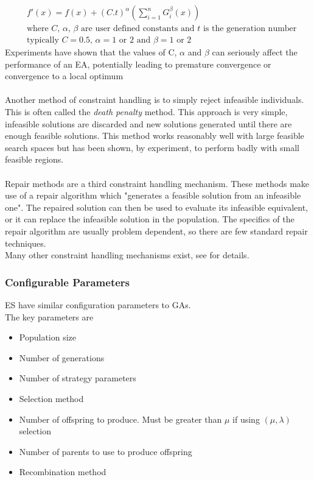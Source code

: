  \begin{equation}
  \begin{split}
    &f'(x) = f(x) + (C.t)^{\alpha}(\sum_{i=1}^{n}{G_{i}^{\beta}(x)}) \\
    &\text{where }C\text{, }\alpha\text{, }\beta\text{ are user defined constants and }t\text{ is the generation number} \\
    &\text{typically }C = 0.5\text{, }\alpha = 1\text{ or } 2\text{ and }\beta = 1\text{ or } 2
  \end{split}
\end{equation}
Experiments have shown that the values of C, $\alpha$ and $\beta$ can seriously affect the performance of an EA, potentially leading to premature convergence or convergence to a local optimum\cite{constraints}
\\\\Another method of constraint handling is to simply reject infeasible individuals. This is often called the \emph{death penalty} method. This approach is very simple, infeasible solutions are discarded and new solutions generated until there are enough feasible solutions. This method works reasonably well with large feasible search spaces but has been shown, by experiment, to perform badly with small feasible regions\cite{esc, constraints, gecco}.
\\\\Repair methods are a third constraint handling mechanism. These methods make use of a repair algorithm which "generates a feasible solution from an infeasible one"\cite{esrev}. The repaired solution can then be used to evaluate its infeasible equivalent, or it can replace the infeasible solution in the population\cite{constraints, esrev}. The specifics of the repair algorithm are usually problem dependent, so there are few standard repair techniques\cite{constraints}.
\\Many other constraint handling mechanisms exist, see \cite{constraints} for details.

\subsubsection{Configurable Parameters}
ES have similar configuration parameters to GAs.
\\The key parameters are
\begin{itemize}
  \item{Population size}
  \item{Number of generations}
  \item{Number of strategy parameters}
  \item{Selection method}
  \item{Number of offspring to produce. Must be greater than $\mu$ if using $(\mu,\lambda)$ selection}
  \item{Number of parents to use to produce offspring}
  \item{Recombination method}
\end{itemize}

